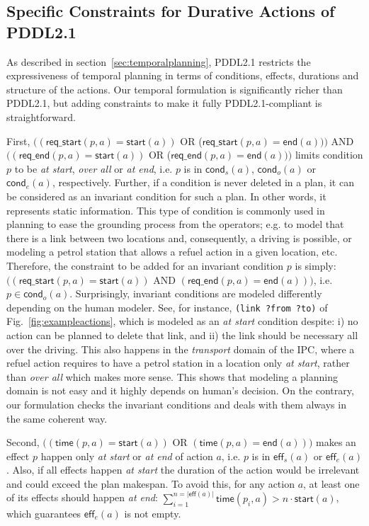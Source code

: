 \documentclass[runningheads]{llncs}
\newcommand{\eff}{\mathsf{eff}}    %
\newcommand{\cond}{\mathsf{cond}}  %
\newcommand{\start}{\mathsf{start}}%
\newcommand{\en}{\mathsf{end}}     %
\newcommand{\tim}{\mathsf{time}}   %
\newcommand{\reqs}{\mathsf{req\_{start}}} %
\newcommand{\reqe}{\mathsf{req\_{end}}}   %
\begin{document}
\subsection{Specific Constraints for Durative Actions of PDDL2.1}
\label{sec:PDDL21constraints}


As described in section~\ref{sec:temporalplanning}, PDDL2.1 restricts the expressiveness of temporal planning in terms of conditions, effects, durations and structure of the actions. Our temporal formulation is significantly richer than PDDL2.1, but adding constraints to make it fully PDDL2.1-compliant is straightforward.


First, $((\reqs(p,a) = \start(a))$ OR ($\reqs(p,a) = \en(a)))$ AND $((\reqe(p,a) = \start(a))$ OR ($\reqe(p,a) = \en(a)))$ limits condition $p$ to be \emph{at start}, \emph{over all} or \emph{at end}, i.e. $p$ is in $\cond_s(a)$, $\cond_o(a)$ or $\cond_e(a)$, respectively.
Further, if a condition is never deleted in a plan, it can be considered as an invariant condition for such a plan. In other words, it represents static information. This type of condition is commonly used in planning to ease the grounding process from the operators; e.g. to model that there is a link between two locations and, consequently, a driving is possible, or modeling a petrol station that allows a refuel action in a given location, etc. Therefore, the constraint to be added for an invariant condition $p$ is simply: $((\reqs(p,a) = \start(a))$ AND $(\reqe(p,a) = \en(a)))$, i.e. $p \in \cond_o(a)$.
Surprisingly, invariant conditions are modeled differently depending on the human modeler. See, for instance, \texttt{(link ?from ?to)} of Fig.~\ref{fig:exampleactions}, which is modeled as an \emph{at start} condition despite: i) no action can be planned to delete that link, and ii) the link should be necessary all over the driving.
This also happens in the \emph{transport} domain of the IPC, where a refuel action requires to have a petrol station in a location only \emph{at start}, rather than \emph{over all} which makes more sense. This shows that modeling a planning domain is not easy and it highly depends on human's decision. On the contrary, our formulation checks the invariant conditions and deals with them always in the same coherent way.


Second, $((\tim(p,a) = \start(a))$ OR $(\tim(p,a) = \en(a)))$ makes an effect $p$ happen only \emph{at start} or \emph{at end} of action $a$, i.e. $p$ is in $\eff_s(a)$ or $\eff_e(a)$.
Also, if all effects happen \emph{at start} the duration of the action would be irrelevant and could exceed the plan makespan. To avoid this, for any action $a$, at least one of its effects should happen \emph{at end}: $\sum_{i=1}^{n =|\eff(a)|} \tim(p_i,a) > n \cdot \start(a)$, which guarantees $\eff_e(a)$ is not empty.
\end{document}
